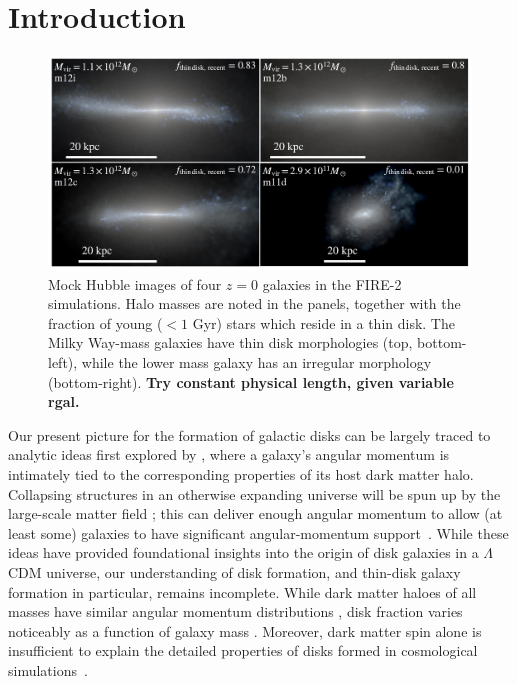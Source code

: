 \documentclass[fleqn,usenatbib]{mnras}
\begin{document}


\section{Introduction}
\label{s: introduction}

\begin{figure}
    \centering
    \includegraphics[width=\textwidth]{figures/stars.pdf}
    \caption{
    Mock Hubble images of four $z=0$ galaxies in the FIRE-2 simulations. Halo masses are noted in the panels, together with the fraction of young ($<1$ Gyr) stars which reside in a thin disk.  The Milky Way-mass galaxies have thin disk morphologies (top, bottom-left), while the lower mass galaxy has an irregular morphology (bottom-right).
    \textbf{Try constant physical length, given variable rgal.}
    }
    \label{f: stars}
\end{figure}

Our present picture for the formation of galactic disks can be largely traced to analytic ideas first explored by \citet{fall1980}, where a galaxy's angular momentum is intimately tied to the corresponding properties of its host dark matter halo.
Collapsing structures in an otherwise expanding universe will be spun up by the large-scale matter field \citep{Peebles69};
this can deliver enough angular momentum to allow (at least some) galaxies to have significant angular-momentum support~\citep[e.g.][]{MMW98}. 
While these ideas have provided foundational insights into the origin of disk galaxies in a $\Lambda$CDM universe, our understanding of disk  formation, and thin-disk galaxy formation in particular, remains incomplete. 
While dark matter haloes of all masses have similar angular momentum distributions \citep[e.g.][]{Barnes87}, disk fraction varies noticeably as a function of galaxy mass \citep[e.g.][]{Bernardi2010, Bluck2014, Moffett16}.
Moreover, dark matter spin alone is insufficient to explain the detailed properties of disks formed in cosmological simulations~\citep[e.g.][]{Sales2012, GK18}.  
\end{document}

